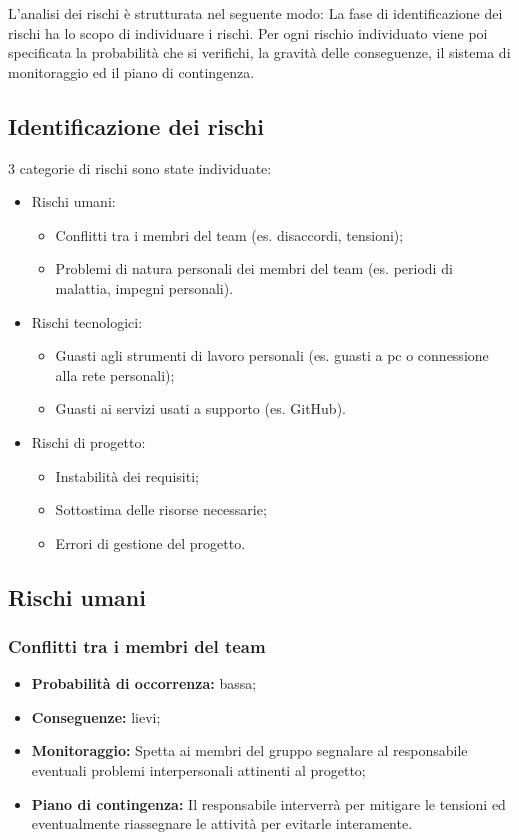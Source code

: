 L'analisi dei rischi è strutturata nel seguente modo:
La fase di identificazione dei rischi ha lo scopo di individuare i rischi.
Per ogni rischio individuato viene poi specificata la probabilità che si verifichi,
la gravità delle conseguenze, il sistema di monitoraggio ed il piano di contingenza.
\subsection{Identificazione dei rischi}
3 categorie di rischi sono state individuate:
\begin{itemize}
\item Rischi umani:
	\begin{itemize}
	\item Conflitti tra i membri del team (es. disaccordi, tensioni);
	\item Problemi di natura personali dei membri del team (es. periodi di malattia, impegni personali).
	\end{itemize}
\item Rischi tecnologici:
	\begin{itemize}
	\item Guasti agli strumenti di lavoro personali (es. guasti a pc o connessione alla rete personali);
	\item Guasti ai servizi usati a supporto (es. GitHub).
	\end{itemize}
\item Rischi di progetto:
	\begin{itemize}
	\item Instabilità dei requisiti;
	\item Sottostima delle risorse necessarie;
	\item Errori di gestione del progetto.
	\end{itemize}
\end{itemize}
\subsection{Rischi umani}
\subsubsection{Conflitti tra i membri del team}
\begin{itemize}
\item \textbf{Probabilità di occorrenza:} bassa;
\item \textbf{Conseguenze:} lievi;
\item \textbf{Monitoraggio:} Spetta ai membri del gruppo segnalare al responsabile eventuali problemi interpersonali attinenti al progetto;
\item \textbf{Piano di contingenza:} Il responsabile interverrà per mitigare le tensioni ed eventualmente riassegnare le attività per evitarle interamente.
\end{itemize}

